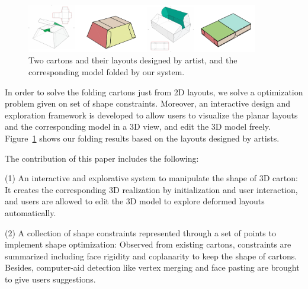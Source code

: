 \begin{figure}
	\centering
	\includegraphics[width=0.9\textwidth]{images/artist}
	\caption{Two cartons and their layouts designed by artist, and the corresponding model folded by our system.}
	\label{fig:artist}
\end{figure}




%
 
 
In order to solve the folding cartons just from 2D layouts, we solve a optimization problem given on  set of shape constraints.
Moreover, an interactive design and exploration framework is developed to allow users to visualize the planar layouts and the corresponding model in a 3D view, and edit the 3D model freely. Figure~\ref{fig:artist} shows our folding results based on the layouts designed by artists. 

The contribution of this paper includes the following:

(1) An interactive and explorative system to manipulate the shape of 3D carton: It creates the corresponding 3D realization by initialization and user interaction, and users are allowed to edit the 3D model to explore deformed layouts automatically.

(2) A collection of shape constraints represented through a set of points to implement shape optimization: Observed from existing cartons, constraints are summarized including face rigidity and coplanarity to keep the shape of cartons. Besides, computer-aid detection like vertex merging and face pasting are brought to give users suggestions. 